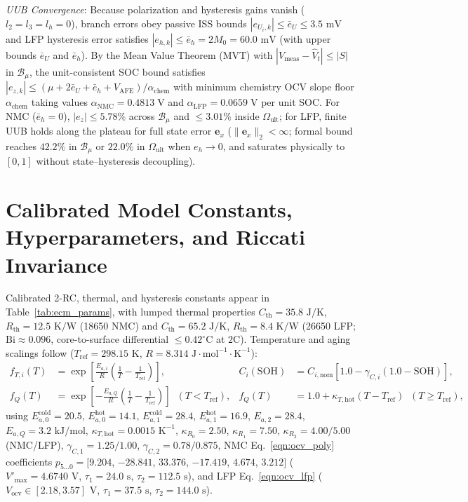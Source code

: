 \documentclass[10pt,a4paper]{article}
\begin{document}
\emph{UUB Convergence}: Because polarization and hysteresis gains vanish ($l_2 = l_3 = l_h = 0$), branch errors obey passive ISS bounds $|e_{U_i,k}| \le \bar{e}_U \le 3.5\text{ mV}$ and LFP hysteresis error satisfies $|e_{h,k}| \le \bar{e}_h = 2 M_0 = 60.0\text{ mV}$ (with upper bounds $\bar{e}_U$ and $\bar{e}_h$). By the Mean Value Theorem (MVT) with $|V_{\text{meas}} - \hat{V}_t| \le |S|$ in $\mathcal{B}_\mu$, the unit-consistent SOC bound satisfies $|e_{z,k}| \le (\mu + 2\bar{e}_U + \bar{e}_h + V_{\text{AFE}})/\alpha_{\text{chem}}$ with minimum chemistry OCV slope floor $\alpha_{\text{chem}}$ taking values $\alpha_{\text{NMC}} = 0.4813\;\mathrm{V}$ and $\alpha_{\text{LFP}} = 0.0659\;\mathrm{V}$ per unit SOC. For NMC ($\bar{e}_h = 0$), $|e_z| \le 5.78\%$ across $\mathcal{B}_\mu$ and $\le 3.01\%$ inside $\Omega_{\text{ult}}$; for LFP, finite UUB holds along the plateau for full state error $\mathbf{e}_x$ ($\|\mathbf{e}_x\|_2 < \infty$; formal bound reaches $42.2\%$ in $\mathcal{B}_\mu$ or $22.0\%$ in $\Omega_{\text{ult}}$ when $e_h \to 0$, and saturates physically to $[0, 1]$ without state--hysteresis decoupling).

\section{Calibrated Model Constants, Hyperparameters, and Riccati Invariance\label{app:parameters}}
Calibrated 2-RC, thermal, and hysteresis constants appear in Table~\ref{tab:ecm_params}, with lumped thermal properties $C_{\text{th}} = 35.8\text{ J/K}$, $R_{\text{th}} = 12.5\text{ K/W}$ (18650 NMC) and $C_{\text{th}} = 65.2\text{ J/K}$, $R_{\text{th}} = 8.4\text{ K/W}$ (26650 LFP; $\text{Bi} \approx 0.096$, core-to-surface differential $\le 0.42^\circ\text{C}$ at $2\text{C}$). Temperature and aging scalings follow ($T_{\text{ref}} = 298.15\text{ K}$, $R = 8.314\text{ J}\cdot\text{mol}^{-1}\cdot\text{K}^{-1}$):
\begin{align*}
f_{T,i}(T) &= \exp\!\left[\frac{E_{a,i}}{R}\left(\frac{1}{T} - \frac{1}{T_{\text{ref}}}\right)\right], &
C_i(\text{SOH}) &= C_{i,\text{nom}}\left[1.0 - \gamma_{C,i}(1.0 - \text{SOH})\right], \\
f_Q(T) &= \exp\!\left[-\frac{E_{a,Q}}{R}\left(\frac{1}{T} - \frac{1}{T_{\text{ref}}}\right)\right] \;\; (T < T_{\text{ref}}), &
f_Q(T) &= 1.0 + \kappa_{T,\text{hot}}(T - T_{\text{ref}}) \;\; (T \ge T_{\text{ref}}),
\end{align*}
using $E_{a,0}^{\text{cold}} = 20.5$, $E_{a,0}^{\text{hot}} = 14.1$, $E_{a,1}^{\text{cold}} = 28.4$, $E_{a,1}^{\text{hot}} = 16.9$, $E_{a,2} = 28.4$, $E_{a,Q} = 3.2\text{ kJ/mol}$, $\kappa_{T,\text{hot}} = 0.0015\text{ K}^{-1}$, $\kappa_{R_0} = 2.50$, $\kappa_{R_1} = 7.50$, $\kappa_{R_2} = 4.00/5.00$ (NMC/LFP), $\gamma_{C,1} = 1.25/1.00$, $\gamma_{C,2} = 0.78/0.875$, NMC Eq.~\eqref{eqn:ocv_poly} coefficients $p_{5\dots 0} = [9.204$, $-28.841$, $33.376$, $-17.419$, $4.674$, $3.212]$ ($V'_{\max} = 4.6740\text{ V}$, $\tau_1 = 24.0\text{ s}$, $\tau_2 = 112.5\text{ s}$), and LFP Eq.~\eqref{eqn:ocv_lfp} ($V_{\text{ocv}} \in [2.18, 3.57]\text{ V}$, $\tau_1 = 37.5\text{ s}$, $\tau_2 = 144.0\text{ s}$).
\end{document}
